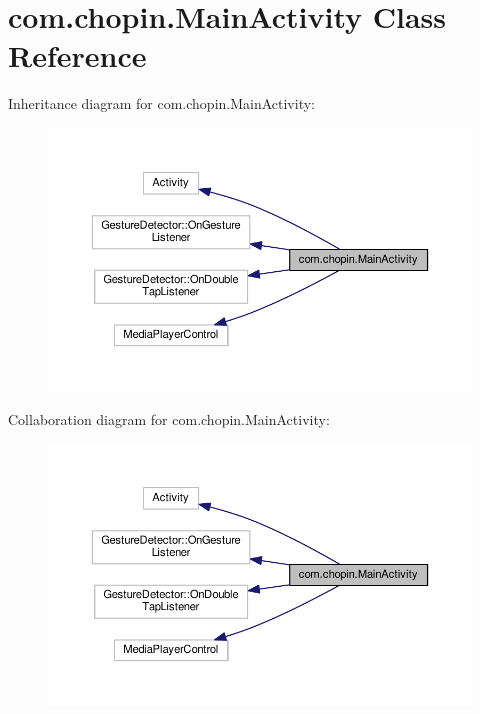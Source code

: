 \hypertarget{classcom_1_1chopin_1_1MainActivity}{}\section{com.\+chopin.\+Main\+Activity Class Reference}
\label{classcom_1_1chopin_1_1MainActivity}


Inheritance diagram for com.\+chopin.\+Main\+Activity\+:
\nopagebreak
\begin{figure}[H]
\begin{center}
\leavevmode
\includegraphics[width=350pt]{classcom_1_1chopin_1_1MainActivity__inherit__graph}
\end{center}
\end{figure}


Collaboration diagram for com.\+chopin.\+Main\+Activity\+:
\nopagebreak
\begin{figure}[H]
\begin{center}
\leavevmode
\includegraphics[width=350pt]{classcom_1_1chopin_1_1MainActivity__coll__graph}
\end{center}
\end{figure}
